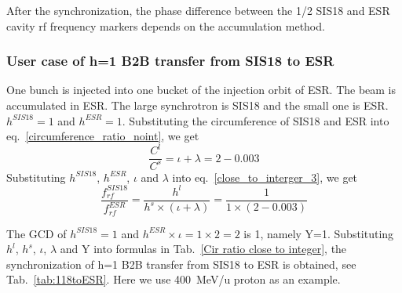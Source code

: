 After the synchronization, the phase difference between the 1/2 SIS18 and ESR cavity rf frequency markers depends on the accumulation method.

\subsubsection{User case of h=1 B2B transfer from SIS18 to ESR} 
One bunch is injected into one bucket of the injection orbit of ESR. The beam is accumulated in ESR. The large synchrotron is SIS18 and the small one is ESR. $h^{SIS18}=1$ and $h^{ESR}=1$. Substituting the circumference of SIS18 and ESR into eq.~\ref{circumference_ratio_noint}, we get
\begin{equation}
\frac{C^l}{C^s}=\iota + \lambda =2-0.003
\end{equation}
Substituting $h^{SIS18}$, $h^{ESR}$, $\iota$ and $\lambda$ into eq.~\ref{close_to_interger_3}, we get
\begin{equation}
\frac {f_{rf}^{SIS18}}{f_{rf}^{ESR}}= \frac{h^l}{h^s \times (\iota+ \lambda)}=\frac {1}{1 \times(2-0.003)}
\end{equation}

The GCD of $h^{SIS18}=1$ and $h^{ESR}\times \iota=1\times 2=2$ is 1, namely Y=1.  Substituting $h^l$, $h^s$, $\iota$, $\lambda$ and Y into formulas in Tab.~\ref{Cir ratio close to integer}, the synchronization of h=1 B2B transfer from SIS18 to ESR is obtained, see Tab.~\ref{tab:118toESR}. Here we use \SI{400}{MeV/\atomicmassunit} proton as an example. 

